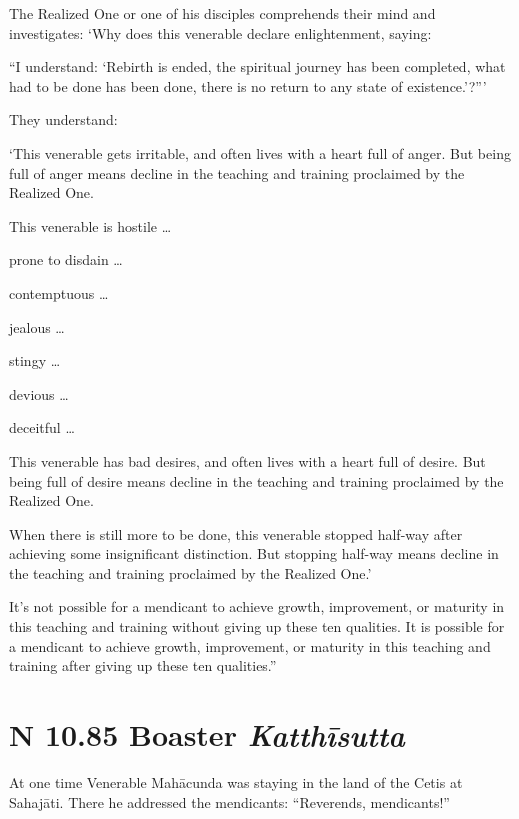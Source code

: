 \documentclass[12pt,openany]{book}%
\newcommand*{\suttatitleacronym}[1]{\smaller[2]{#1}\vspace*{.3em}}
\newcommand*{\suttatitletranslation}[1]{\linebreak{#1}}
\newcommand*{\suttatitleroot}[1]{\linebreak\smaller[2]\itshape{#1}}
\newcommand*{\tocacronym}[1]{\hspace*{-3.3em}{#1}\quad}
\newcommand*{\toctranslation}[1]{#1}
\newcommand*{\tocroot}[1]{(\textit{#1})}
\begin{document}
The Realized One or one of his disciples comprehends their mind and investigates: ‘Why does this venerable declare enlightenment, saying: 

“I understand: ‘Rebirth is ended, the spiritual journey has been completed, what had to be done has been done, there is no return to any state of existence.’?”’ 

They understand: 

‘This venerable gets irritable, and often lives with a heart full of anger. But being full of anger means decline in the teaching and training proclaimed by the Realized One. 

This venerable is hostile … 

prone to disdain … 

contemptuous … 

jealous … 

stingy … 

devious … 

deceitful … 

This venerable has bad desires, and often lives with a heart full of desire. But being full of desire means decline in the teaching and training proclaimed by the Realized One. 

When there is still more to be done, this venerable stopped half-way after achieving some insignificant distinction. But stopping half-way means decline in the teaching and training proclaimed by the Realized One.’ 

It’s not possible for a mendicant to achieve growth, improvement, or maturity in this teaching and training without giving up these ten qualities. It is possible for a mendicant to achieve growth, improvement, or maturity in this teaching and training after giving up these ten qualities.” 

%
\section*{{\suttatitleacronym AN 10.85}{\suttatitletranslation A Boaster }{\suttatitleroot Katthīsutta}}
\addcontentsline{toc}{section}{\tocacronym{AN 10.85} \toctranslation{A Boaster } \tocroot{Katthīsutta}}

At one time Venerable \textsanskrit{Mahācunda} was staying in the land of the Cetis at \textsanskrit{Sahajāti}. There he addressed the mendicants: “Reverends, mendicants!” 
\end{document}
